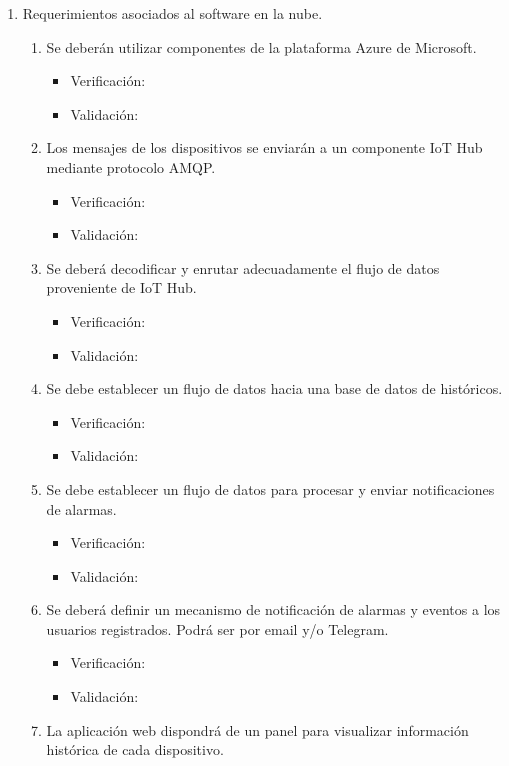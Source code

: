 \documentclass[
11pt, %
]{charter}
\begin{document}
\begin{enumerate}
	\item Requerimientos asociados al software en la nube.
		\begin{enumerate}
			\item Se deberán utilizar componentes de la plataforma Azure de Microsoft.
			\begin{itemize}
				\item Verificación:
				\item Validación: 
			\end{itemize}
			\item Los mensajes de los dispositivos se enviarán a un componente IoT Hub mediante protocolo AMQP.
			\begin{itemize}
				\item Verificación:
				\item Validación: 
			\end{itemize}
			\item Se deberá decodificar y enrutar adecuadamente el flujo de datos proveniente de IoT Hub.
			\begin{itemize}
				\item Verificación:
				\item Validación: 
			\end{itemize}
			\item Se debe establecer un flujo de datos hacia una base de datos de históricos.
			\begin{itemize}
				\item Verificación:
				\item Validación: 
			\end{itemize}
			\item Se debe establecer un flujo de datos para procesar y enviar notificaciones de alarmas.
			\begin{itemize}
				\item Verificación:
				\item Validación: 
			\end{itemize}
			\item Se deberá definir un mecanismo de notificación de alarmas y eventos a los usuarios registrados. Podrá ser por email y/o Telegram.
			\begin{itemize}
				\item Verificación:
				\item Validación: 
			\end{itemize}
			\item La aplicación web dispondrá de un panel para visualizar información histórica de cada dispositivo.

\end{enumerate}
\end{enumerate}
\end{document}

